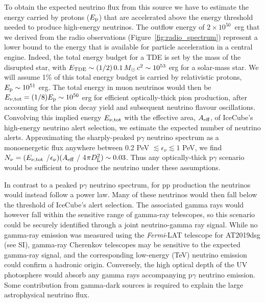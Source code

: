 To obtain the expected neutrino flux from this source we have to estimate the energy carried by protons ($E_{\textup{p}}$) that are accelerated above the energy threshold needed to produce high-energy neutrinos. 
The outflow energy of $2 \times 10^{50}$~erg that we derived from the radio observations (Figure~\ref{fig:radio_spectrum}) represent a lower bound to the energy that is available for particle acceleration in a central engine.  Indeed, the total energy budget for a TDE is set by the mass of the disrupted star, with $E_{\textup{TDE}} \sim (1/2)\, 0.1 \, \mbox{$M_{\odot}$} \, c^{2} \sim 10^{53}$ erg for a solar-mass star. We will assume 1\% of this total energy budget is carried by relativistic protons, $E_{\textup{p}} \sim 10^{51}$ erg. The total energy in muon neutrinos would then be $E_{\nu, \textup{tot}} = (1/8) E_{\textup{p}} \sim 10^{50}$ erg for efficient optically-thick pion production, after accounting for the pion decay yield and subsequent neutrino flavour oscillations. Convolving this implied energy $E_{\nu, \textup{tot}}$ with the effective area, $A_{\textup{eff}}$, of IceCube's high-energy neutrino alert selection\cite{2019ICRC...36.1021B}, we estimate the expected number of neutrino alerts. Approximating the sharply-peaked p$\gamma$ neutrino spectrum as a monoenergetic flux anywhere between  0.2 PeV $\lesssim \epsilon_\nu \lesssim 1$ PeV, we find $N_\nu = (E_{\nu, \textup{tot}}$ /$\epsilon_\nu)(A_{\textup{eff}}$ / 4$\pi D_{\textup{L}}^{2})  \sim 0.03$. Thus any optically-thick p$\gamma$ scenario would be sufficient to produce the neutrino under these assumptions. 

In contrast to a peaked p$\gamma$ neutrino spectrum, for pp production the neutrinos would instead follow a power law. Many of these neutrinos would then fall below the threshold of IceCube's alert selection. The associated gamma rays would however fall within the sensitive range of gamma-ray telescopes, so this scenario could be securely identified through a joint neutrino-gamma ray signal. While no gamma-ray emission was measured using the \textit{Fermi}-LAT telescope for AT2019dsg (see SI), gamma-ray Cherenkov telescopes may be sensitive to the expected gamma-ray signal, and the corresponding low-energy (TeV) neutrino emission could confirm a hadronic origin. Conversely, the high optical depth of the UV photosphere would absorb any gamma rays accompanying p$\gamma$ neutrino emission\cite{2016PhRvD..93h3005W}. Some contribution from gamma-dark sources is required to explain the large astrophysical neutrino flux\cite{2016PhRvL.116g1101M}.


